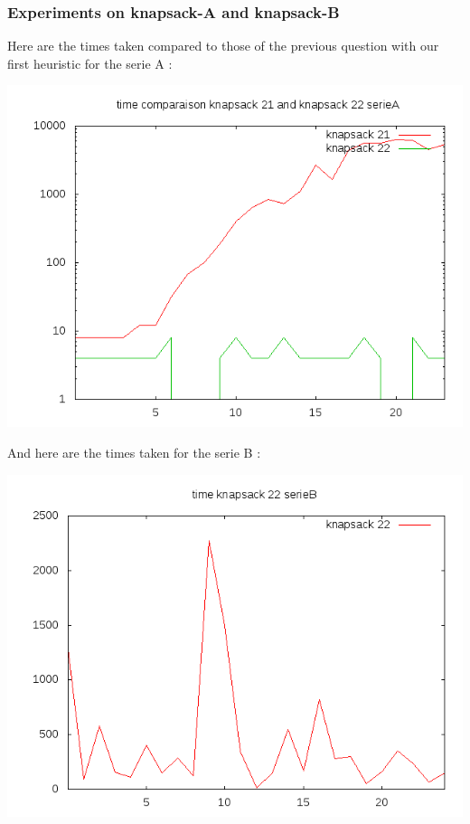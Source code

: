 \documentclass{eplDoc}
\begin{document}
\subsubsection{Experiments on knapsack-A and knapsack-B}
Here are the times taken compared to those of the previous question with our first heuristic for the serie A : 
\begin{center}
\includegraphics[width=\columnwidth]{q32timeA.png}%
\end{center}
And here are the times taken for the serie B : 
\begin{center}
\includegraphics[width=\columnwidth]{q322timeB.png}%
\end{center}
\end{document}
